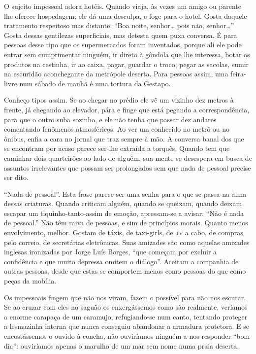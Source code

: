 O sujeito impessoal adora hotéis. Quando viaja, às vezes um amigo ou
parente lhe oferece hospedagem; ele dá uma desculpa, e foge para o
hotel. Gosta daquele tratamento respeitoso mas distante: “Boa noite,
senhor… pois não, senhor…” Gosta dessas gentilezas superficiais, mas
detesta quem puxa conversa. É para pessoas desse tipo que os
supermercados foram inventados, porque ali ele pode entrar sem
cumprimentar ninguém, ir direto à gôndola que lhe interessa, botar os
produtos na cestinha, ir ao caixa, pagar, guardar o troco, pegar as
sacolas, sumir na escuridão aconchegante da metrópole deserta. Para
pessoas assim, uma feira-livre num sábado de manhã é uma tortura da
Gestapo.

Conheço tipos assim. Se ao chegar no prédio ele vê um vizinho dez
metros à frente, já chegando ao elevador, pára e finge que está
pegando a correspondência, para que o outro suba sozinho, e ele não
tenha que passar dez andares comentando fenômenos atmosféricos.  Ao
ver um conhecido no metrô ou no ônibus, enfia a cara no jornal que
traz sempre à mão. A conversa banal dos que se encontram por acaso
parece ser-lhe extraída a torquês. Quando tem que caminhar dois
quarteirões ao lado de alguém, sua mente se desespera em busca de
assuntos irrelevantes que possam ser prolongados sem que nada de
pessoal precise ser dito.

“Nada de pessoal”. Esta frase parece ser uma senha para o que se passa
na alma dessas criaturas. Quando criticam alguém, quando se queixam,
quando deixam escapar um tiquinho-tanto-assim de emoção, apressam-se
a avisar: “Não é nada de pessoal.”  Não têm raiva de pessoas, e sim
de princípios morais. Quanto menos envolvimento, melhor. Gostam de
táxis, de taxi-girls, de \textsc{tv} a cabo, de compras pelo correio, de
secretárias eletrônicas. Suas amizades são como aquelas amizades
inglesas ironizadas por Jorge Luís Borges, “que começam por excluir a
confidência e que muito depressa omitem o diálogo”. Aceitam a
companhia de outras pessoas, desde que estas se comportem menos como
pessoas do que como peças da mobília. 

Os impessoais fingem que não nos viram, fazem o possível para não nos
escutar. Se ao cruzar com eles no saguão os enxergássemos como são
realmente, veríamos a enorme carapaça de um caramujo, refugiando-se
num canto, tentando proteger a lesmazinha interna que nunca conseguiu
abandonar a armadura protetora. E se encostássemos o ouvido à concha,
não ouviríamos ninguém a nos responder “bom-dia”: ouviríamos apenas o
marulho de um mar sem nome numa praia deserta.


